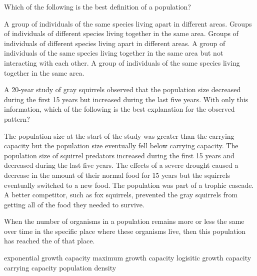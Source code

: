 \question
Which of the following is the best definition of a population?

\begin{choices}
\choice A group of individuals of the same species living apart in different areas.%
\choice Groups of individuals of different species living together in the same area.%
\choice Groups of individuals of different species living apart in different areas.%
\choice A group of individuals of the same species living together in the same area but not interacting with each other.%
\correctchoice A group of individuals of the same species living together in the same area.%
\end{choices}


\question
A 20-year study of gray squirrels observed that the population size decreased during the first 15 years but increased during the last five years. With only this information, which of the following is the best explanation for the observed pattern?

\begin{choices}
\correctchoice The population size at the start of the study was greater than the carrying capacity but the population size eventually fell below carrying capacity. %
\choice The population size of squirrel predators increased during the first 15 years and decreased during the last five years. %
\choice The effects of a severe drought caused a decrease in the amount of their normal food for 15 years but the squirrels eventually switched to a new food. %
\choice The population was part of a trophic cascade. %
\choice A better competitor, such as fox squirrels, prevented the gray squirrels from getting all of the food they needed to survive.%
\end{choices}

\question
When the number of organisms in a population remains more or less the same over time in the specific place where these organisms live, then this population has reached the \underline{\hspace{2cm}} of that place.

\begin{choices}
\choice exponential growth capacity%
\choice maximum growth capacity%
\choice logisitic growth capacity%
\correctchoice carrying capacity%
\choice population density%
\end{choices}

